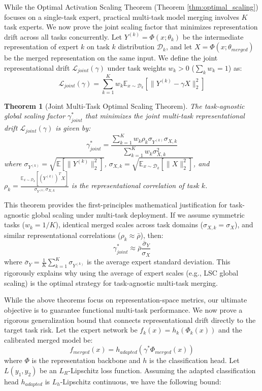 \documentclass{article}
\theoremstyle{plain}
\newtheorem{theorem}{Theorem}[section]
\theoremstyle{definition}
\theoremstyle{remark}
\begin{document}
While the Optimal Activation Scaling Theorem (Theorem \ref{thm:optimal_scaling}) focuses on a single-task expert, practical multi-task model merging involves $K$ task experts. We now prove the joint scaling factor that minimizes representation drift across all tasks concurrently. Let $Y^{(k)} = \Phi(x; \theta_k)$ be the intermediate representation of expert $k$ on task $k$ distribution $\mathcal{D}_k$, and let $X = \Phi(x; \theta_{merged})$ be the merged representation on the same input. We define the joint representational drift $\mathcal{L}_{joint}(\gamma)$ under task weights $w_k > 0$ ($\sum_k w_k = 1$) as:
$$\mathcal{L}_{joint}(\gamma) = \sum_{k=1}^K w_k \mathbb{E}_{x \sim \mathcal{D}_k} \left[ \| Y^{(k)} - \gamma X \|_2^2 \right]$$

\begin{theorem}[Joint Multi-Task Optimal Scaling Theorem]\label{thm:joint_optimal_scaling}
The task-agnostic global scaling factor $\gamma_{joint}^*$ that minimizes the joint multi-task representational drift $\mathcal{L}_{joint}(\gamma)$ is given by:
$$\gamma_{joint}^* = \frac{\sum_{k=1}^K w_k \rho_k \sigma_{Y^{(k)}} \sigma_{X, k}}{\sum_{k=1}^K w_k \sigma_{X, k}^2}$$
where $\sigma_{Y^{(k)}} = \sqrt{\mathbb{E}[\|Y^{(k)}\|_2^2]}$, $\sigma_{X, k} = \sqrt{\mathbb{E}_{x \sim \mathcal{D}_k}[\|X\|_2^2]}$, and $\rho_k = \frac{\mathbb{E}_{x \sim \mathcal{D}_k}[(Y^{(k)})^T X]}{\sigma_{Y^{(k)}} \sigma_{X, k}}$ is the representational correlation of task $k$.
\end{theorem}

This theorem provides the first-principles mathematical justification for task-agnostic global scaling under multi-task deployment. If we assume symmetric tasks ($w_k = 1/K$), identical merged scales across task domains ($\sigma_{X, k} = \sigma_X$), and similar representational correlations ($\rho_k \approx \bar{\rho}$), then:
$$\gamma_{joint}^* \approx \bar{\rho} \frac{\bar{\sigma}_Y}{\sigma_X}$$
where $\bar{\sigma}_Y = \frac{1}{K} \sum_{k=1}^K \sigma_{Y^{(k)}}$ is the average expert standard deviation. This rigorously explains why using the average of expert scales (e.g., LSC global scaling) is the optimal strategy for task-agnostic multi-task merging.

While the above theorems focus on representation-space metrics, our ultimate objective is to guarantee functional multi-task performance. We now prove a rigorous generalization bound that connects representational drift directly to the target task risk.
Let the expert network be $f_k(x) = h_k(\Phi_k(x))$ and the calibrated merged model be:
$$f_{merged}(x) = h_{adapted}(\gamma^* \Phi_{merged}(x))$$
where $\Phi$ is the representation backbone and $h$ is the classification head.
Let $L(y_1, y_2)$ be an $L_R$-Lipschitz loss function. Assuming the adapted classification head $h_{adapted}$ is $L_h$-Lipschitz continuous, we have the following bound:
\end{document}
